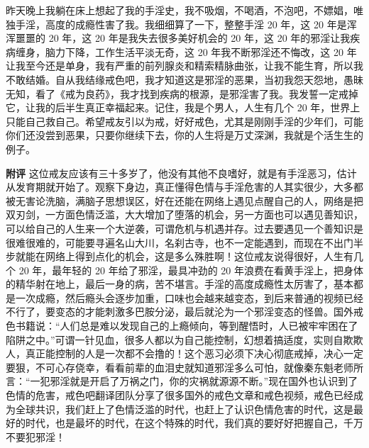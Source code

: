 \begin{case}
    昨天晚上我躺在床上想起了我的手淫史，我不吸烟，不喝酒，不泡吧，不嫖娼，唯独手淫，高度的成瘾性害了我。我细细算了一下，整整手淫 20 年，这 20 年是浑浑噩噩的 20 年，这 20 年是我失去很多美好机会的 20 年，这 20 年的邪淫让我疾病缠身，脑力下降，工作生活平淡无奇，这 20 年我不断邪淫还不悔改，这 20 年让我至今还是单身，我有严重的前列腺炎和精索精脉曲张，让我不能生育，所以我不敢结婚。自从我结缘戒色吧，我才知道这是邪淫的恶果，当初我怨天怨地，愚昧无知，看了《戒为良药》，我才找到疾病的根源，是邪淫害了我。我发誓一定戒掉它，让我的后半生真正幸福起来。记住，我是个男人，人生有几个 20 年，世界上只能自己救自己。希望戒友引以为戒，好好戒色，尤其是刚刚手淫的少年们，可能你们还没尝到恶果，只要你继续下去，你的人生将是万丈深渊，我就是个活生生的例子。

    \textbf{附评} 这位戒友应该有三十多岁了，他没有其他不良嗜好，就是有手淫恶习，估计从发育期就开始了。观察下身边，真正懂得色情与手淫危害的人其实很少，大多都被无害论洗脑，满脑子思想误区，好在还能在网络上遇见点醒自己的人，网络是把双刃剑，一方面色情泛滥，大大增加了堕落的机会，另一方面也可以遇见善知识，可以给自己的人生来一个大逆袭，可谓危机与机遇并存。过去要遇见一个善知识是很难很难的，可能要寻遍名山大川，名刹古寺，也不一定能遇到，而现在不出门半步就能在网络上得到点化的机会，这是多么殊胜啊！这位戒友说得很好，人生有几个 20 年，最年轻的 20 年给了邪淫，最具冲劲的 20 年浪费在看黄手淫上，把身体的精华射在地上，最后一身的病，苦不堪言。手淫的高度成瘾性太厉害了，基本都是一次成瘾，然后瘾头会逐步加重，口味也会越来越变态，到后来普通的视频已经不行了，要变态的才能刺激多巴胺分泌，最后就沦为一个邪淫变态的怪兽。国外戒色书籍说：“人们总是难以发现自己的上瘾倾向，等到醒悟时，人已被牢牢困在了陷阱之中。”可谓一针见血，很多人都以为自己能控制，幻想着搞适度，实则自欺欺人，真正能控制的人是一次都不会撸的！这个恶习必须下决心彻底戒掉，决心一定要狠，不可心存侥幸，看看前辈的血泪史就知道邪淫多么可怕，就像秦东魁老师所言：“一犯邪淫就是开启了万祸之门，你的灾祸就源源不断。”现在国外也认识到了色情的危害，戒色吧翻译团队分享了很多国外的戒色文章和戒色视频，戒色已经成为全球共识，我们赶上了色情泛滥的时代，也赶上了认识色情危害的时代，这是最好的时代，也是最坏的时代，在这个特殊的时代，我们真的要好好把握自己，千万不要犯邪淫！
\end{case}

